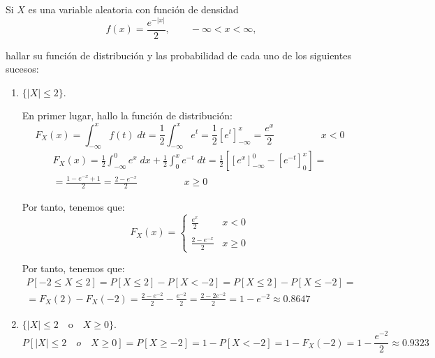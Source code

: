 \begin{ejercicio}
    Si $X$ es una variable aleatoria con función de densidad
    \begin{equation*}
        f(x)=\frac{e^{-|x|}}{2},\qquad -\infty<x<\infty,
    \end{equation*}

    hallar su función de distribución y las probabilidad de cada uno de los siguientes sucesos:
    \begin{enumerate}
        \item $\{|X|\leq 2\}$.

        En primer lugar, hallo la función de distribución:
        \begin{equation*}
            F_X(x)=\int_{-\infty}^x f(t)\;dt
            = \frac{1}{2}\int_{-\infty}^x e^t = \frac{1}{2}[e^t]_{-\infty}^x = \frac{e^x}{2} \hspace{2cm} x<0
        \end{equation*}
        \begin{multline*}
            F_X(x)=\frac{1}{2}\int_{-\infty}^0 e^x\;dx + \frac{1}{2}\int_{0}^x e^{-t}\;dt
            = \frac{1}{2}\left[[e^x]_{-\infty}^0 -\left[e^{-t}\right]_0^x\right]
            =\\= \frac{1-e^{-x}+1}{2}
            = \frac{2-e^{-x}}{2}
            \hspace{2cm} x\geq 0
        \end{multline*}

        Por tanto, tenemos que:
        \begin{equation*}
            F_X(x)=\left\{\begin{array}{cc}
                \displaystyle \frac{e^x}{2} & x<0 \\ \\
                \displaystyle \frac{2-e^{-x}}{2} & x\geq 0
            \end{array}\right.
        \end{equation*}

        Por tanto, tenemos que:
        \begin{multline*}
            P[-2\leq X\leq 2] = P[X\leq 2] - P[X<-2]
            = P[X\leq 2] - P[X\leq -2]
            =\\= F_X(2)-F_X(-2)
            = \frac{2-e^{-2}}{2} - \frac{e^{-2}}{2}
            = \frac{2-2e^{-2}}{2}
            = 1-e^{-2}\approx 0.8647
        \end{multline*}

        
        \item $\{|X|\leq 2 \quad \text{o} \quad X\geq 0\}$.
        \begin{equation*}
            P[|X|\leq 2\quad o \quad X\geq 0] = P[X\geq -2] = 1-P[X<-2] = 1-F_X(-2)=1-\frac{e^{-2}}{2} \approx 0.9323
        \end{equation*}
        

\end{enumerate}
\end{ejercicio}
